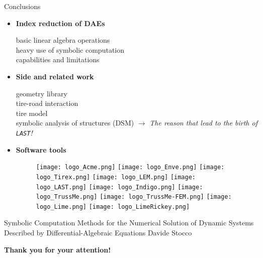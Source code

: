 \begin{frame}{Conclusions}
  \begin{itemize}
    \item \textbf{Index reduction of \acsp{DAE}} \\
    \begin{small}
      \qquad basic linear algebra operations \\
      \qquad heavy use of symbolic computation \\
      \qquad capabilities and limitations
    \end{small}
    \item \textbf{Side and related work} \\
    \begin{small}
      \qquad geometry library \\
      \qquad tire-road interaction \\
      \qquad tire model \\
      \qquad symbolic analysis of structures (\acs{DSM}) $\rightarrow$ \emph{The reason that lead to the birth of \texttt{LAST}!}
    \end{small}
    \item \textbf{Software tools} \\[0.2em]
    \begin{figure}
      \centering
      \texttt{[image: logo\_Acme.png]}%
      \texttt{[image: logo\_Enve.png]}%
      \texttt{[image: logo\_Tirex.png]}%
      \texttt{[image: logo\_LEM.png]}%
      \texttt{[image: logo\_LAST.png]}%
      \texttt{[image: logo\_Indigo.png]}%
      \texttt{[image: logo\_TrussMe.png]}%
      \texttt{[image: logo\_TrussMe-FEM.png]}%
      \texttt{[image: logo\_Lime.png]}%
      \texttt{[image: logo\_LimeRickey.png]}
    \end{figure}
  \end{itemize}
\end{frame}

\begin{frame}[plain]{%
  \large%
  Symbolic Computation Methods for the Numerical %
  Solution of Dynamic Systems Described by %
  Differential-Algebraic Equations
  }{Davide Stocco}
  \vfill
  \raggedright{\selectfont\huge\color{tx_sl_color}\bfseries{Thank you for your attention!}} \\[0.5em]
\end{frame}

